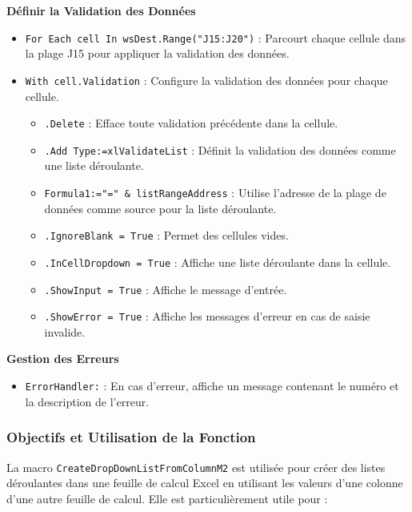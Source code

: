 \documentclass[a4paper, oneside, 12pt, final]{extreport}
\begin{document}
\textbf{Définir la Validation des Données}

\begin{itemize}
    \item \texttt{For Each cell In wsDest.Range("J15:J20")} : Parcourt chaque cellule dans la plage J15 pour appliquer la validation des données.
    \item \texttt{With cell.Validation} : Configure la validation des données pour chaque cellule.
    \begin{itemize}
        \item \texttt{.Delete} : Efface toute validation précédente dans la cellule.
        \item \texttt{.Add Type:=xlValidateList} : Définit la validation des données comme une liste déroulante.
        \item \texttt{Formula1:="=" \& listRangeAddress} : Utilise l'adresse de la plage de données comme source pour la liste déroulante.
        \item \texttt{.IgnoreBlank = True} : Permet des cellules vides.
        \item \texttt{.InCellDropdown = True} : Affiche une liste déroulante dans la cellule.
        \item \texttt{.ShowInput = True} : Affiche le message d'entrée.
        \item \texttt{.ShowError = True} : Affiche les messages d'erreur en cas de saisie invalide.
    \end{itemize}
\end{itemize}

\textbf{Gestion des Erreurs}

\begin{itemize}
    \item \texttt{ErrorHandler:} : En cas d'erreur, affiche un message contenant le numéro et la description de l'erreur.
\end{itemize}

\subsubsection{Objectifs et Utilisation de la Fonction}

La macro \texttt{CreateDropDownListFromColumnM2} est utilisée pour créer des listes déroulantes dans une feuille de calcul Excel en utilisant les valeurs d'une colonne d'une autre feuille de calcul. Elle est particulièrement utile pour :
\end{document}
